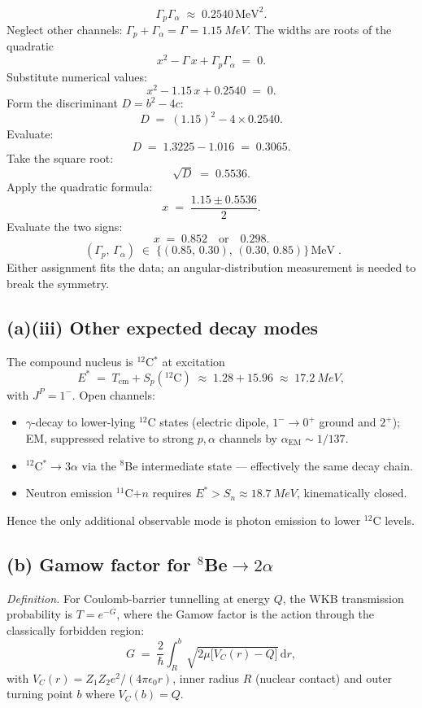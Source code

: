 \documentclass[11pt]{article}
\newcommand{\de}{\mathrm{d}}
\begin{document}
\[
\Gamma_{p}\Gamma_{\alpha}\;\approx\;0.2540\,\text{MeV}^{2}.
\]
Neglect other channels: $\Gamma_{p}+\Gamma_{\alpha}=\Gamma=\SI{1.15}{MeV}$. The widths are roots of the quadratic
\[
x^{2}-\Gamma\,x+\Gamma_{p}\Gamma_{\alpha}\;=\;0.
\]
Substitute numerical values:
\[
x^{2}-1.15\,x+0.2540\;=\;0.
\]
Form the discriminant $D=b^{2}-4c$:
\[
D\;=\;(1.15)^{2}-4\times 0.2540.
\]
Evaluate:
\[
D\;=\;1.3225-1.016\;=\;0.3065.
\]
Take the square root:
\[
\sqrt{D}\;=\;0.5536.
\]
Apply the quadratic formula:
\[
x\;=\;\frac{1.15\pm 0.5536}{2}.
\]
Evaluate the two signs:
\[
x\;=\;0.852\quad\text{or}\quad 0.298.
\]
\begin{equation}
\boxed{\;(\Gamma_{p},\,\Gamma_{\alpha})\;\in\;\{(0.85,\,0.30),\,(0.30,\,0.85)\}\,\text{MeV}\;.}
\label{eq:partial-widths}
\end{equation}
Either assignment fits the data; an angular-distribution measurement is needed to break the symmetry.

\subsection*{(a)(iii) Other expected decay modes}

The compound nucleus is $^{12}$C$^{*}$ at excitation
\[
E^{*}\;=\;T_\text{cm}+S_{p}(^{12}\!\text{C})\;\approx\;1.28+15.96\;\approx\;\SI{17.2}{MeV},
\]
with $J^{P}=1^{-}$. Open channels:
\begin{itemize}
  \item $\gamma$-decay to lower-lying $^{12}$C states (electric dipole, $1^{-}\to 0^{+}$ ground and $2^{+}$); EM, suppressed relative to strong $p,\alpha$ channels by $\alpha_\text{EM}\sim 1/137$.
  \item $^{12}$C$^{*}\to 3\alpha$ via the $^{8}$Be intermediate state --- effectively the same decay chain.
  \item Neutron emission $^{11}$C$+n$ requires $E^{*}>S_{n}\approx\SI{18.7}{MeV}$, kinematically closed.
\end{itemize}
Hence the only additional observable mode is photon emission to lower $^{12}$C levels.

\subsection*{(b) Gamow factor for $^{8}$Be$\to 2\alpha$}

\emph{Definition.} For Coulomb-barrier tunnelling at energy $Q$, the WKB transmission probability is $T=e^{-G}$, where the Gamow factor is the action through the classically forbidden region:
\begin{equation}
G\;=\;\frac{2}{\hbar}\int_{R}^{b}\!\sqrt{2\mu\bigl[V_{C}(r)-Q\bigr]}\,\de r,
\label{eq:Gamow-def}
\end{equation}
with $V_{C}(r)=Z_{1}Z_{2}e^{2}/(4\pi\epsilon_{0}r)$, inner radius $R$ (nuclear contact) and outer turning point $b$ where $V_{C}(b)=Q$.
\end{document}
